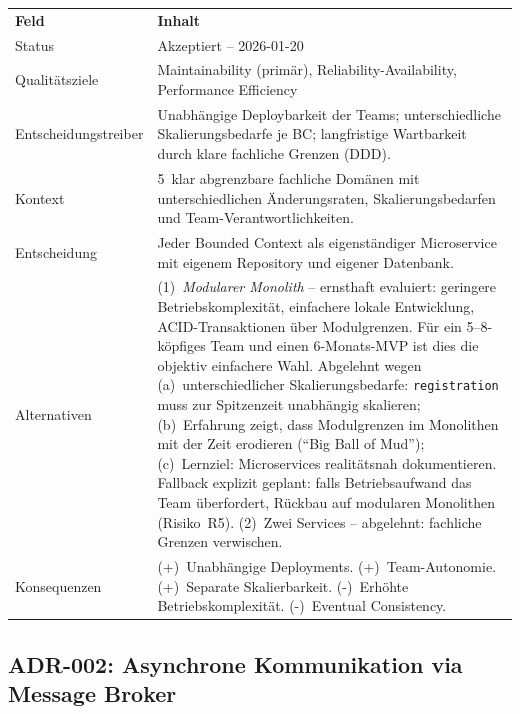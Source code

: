 \begin{tabularx}{\textwidth}{L{3.5cm} X}
  \color{white}\textbf{Feld} & \color{white}\textbf{Inhalt} \\
  Status & Akzeptiert -- 2026-01-20 \\
  Qualitätsziele & Maintainability (primär), Reliability-Availability, Performance Efficiency \\
  Entscheidungstreiber & Unabhängige Deploybarkeit der Teams; unterschiedliche Skalierungsbedarfe je BC; langfristige Wartbarkeit durch klare fachliche Grenzen (DDD). \\
  Kontext & 5~klar abgrenzbare fachliche Domänen mit unterschiedlichen Änderungsraten, Skalierungsbedarfen und Team-Verantwortlichkeiten. \\
  Entscheidung & Jeder Bounded Context als eigenständiger Microservice mit eigenem Repository und eigener Datenbank. \\
  Alternativen & (1)~\emph{Modularer Monolith} -- ernsthaft evaluiert:
  geringere Betriebskomplexität, einfachere lokale Entwicklung,
  ACID-Transaktionen über Modulgrenzen. Für ein 5--8-köpfiges Team und
  einen 6-Monats-MVP ist dies die objektiv einfachere Wahl.
  Abgelehnt wegen (a)~unterschiedlicher Skalierungsbedarfe:
  \texttt{registration} muss zur Spitzenzeit unabhängig skalieren;
  (b)~Erfahrung zeigt, dass Modulgrenzen im Monolithen mit der Zeit
  erodieren (``Big Ball of Mud''); (c)~Lernziel: Microservices
  realitätsnah dokumentieren.
  Fallback explizit geplant: falls Betriebsaufwand das Team überfordert,
  Rückbau auf modularen Monolithen (Risiko~R5).
  (2)~Zwei Services -- abgelehnt: fachliche Grenzen verwischen. \\
  Konsequenzen & (+)~Unabhängige Deployments. (+)~Team-Autonomie. (+)~Separate Skalierbarkeit. (-)~Erhöhte Betriebskomplexität. (-)~Eventual Consistency. \\
\end{tabularx}

\subsection{ADR-002: Asynchrone Kommunikation via Message Broker}

